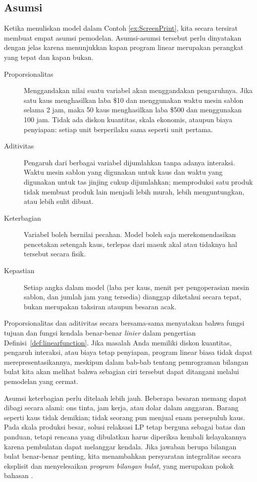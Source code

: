 \subsection{Asumsi}
\label{sec:lp-assumptions}
Ketika menuliskan model dalam Contoh \ref{ex:ScreenPrint}, kita secara tersirat membuat empat asumsi pemodelan. Asumsi-asumsi tersebut perlu dinyatakan dengan jelas karena menunjukkan kapan program linear merupakan perangkat yang tepat dan kapan bukan.

\begin{description}
\item[Proporsionalitas] Menggandakan nilai suatu variabel akan menggandakan pengaruhnya. Jika satu kaus menghasilkan laba \$10 dan menggunakan waktu mesin sablon selama 2 jam, maka 50 kaus menghasilkan laba \$500 dan menggunakan 100 jam. Tidak ada diskon kuantitas, skala ekonomis, ataupun biaya penyiapan: setiap unit berperilaku sama seperti unit pertama.

\item[Aditivitas] Pengaruh dari berbagai variabel dijumlahkan tanpa adanya interaksi. Waktu mesin sablon yang digunakan untuk kaus dan waktu yang digunakan untuk tas jinjing cukup dijumlahkan; memproduksi satu produk tidak membuat produk lain menjadi lebih murah, lebih menguntungkan, atau lebih sulit dibuat.

\item[Keterbagian] Variabel boleh bernilai pecahan. Model boleh saja merekomendasikan pencetakan setengah kaus, terlepas dari masuk akal atau tidaknya hal tersebut secara fisik.

\item[Kepastian] Setiap angka dalam model (laba per kaus, menit per pengoperasian mesin sablon, dan jumlah jam yang tersedia) dianggap diketahui secara tepat, bukan merupakan taksiran ataupun besaran acak.
\end{description}

Proporsionalitas dan aditivitas secara bersama-sama menyatakan bahwa fungsi tujuan dan fungsi kendala benar-benar \emph{linier} dalam pengertian Definisi~\ref{def:linearfunction}. Jika masalah Anda memiliki diskon kuantitas, pengaruh interaksi, atau biaya tetap penyiapan, program linear biasa tidak dapat merepresentasikannya, meskipun dalam bab-bab tentang pemrograman bilangan bulat kita akan melihat bahwa sebagian ciri tersebut dapat ditangani melalui pemodelan yang cermat.

Asumsi keterbagian perlu ditelaah lebih jauh. Beberapa besaran memang dapat dibagi secara alami: ons tinta, jam kerja, atau dolar dalam anggaran. Barang seperti kaus tidak demikian; tidak seorang pun menjual enam persepuluh kaus. Pada skala produksi besar, solusi relaksasi LP tetap berguna sebagai batas dan panduan, tetapi rencana yang dibulatkan harus diperiksa kembali kelayakannya karena pembulatan dapat melanggar kendala. Jika jawaban berupa bilangan bulat benar-benar penting, kita menambahkan persyaratan integralitas secara eksplisit dan menyelesaikan \emph{program bilangan bulat}, yang merupakan pokok bahasan \OOIntegerProgrammingReference{}.

